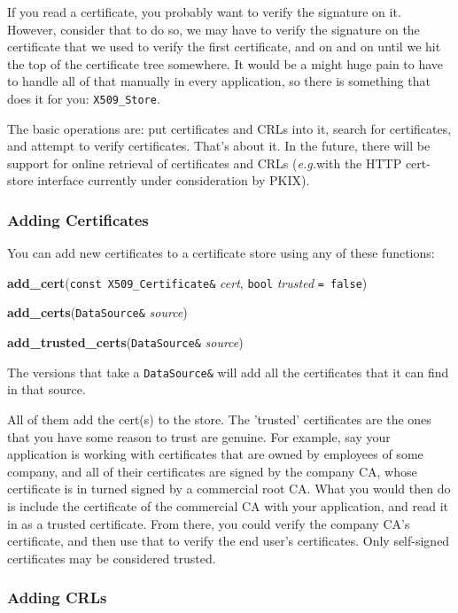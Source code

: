 \documentclass{article}
\newcommand{\function}[1]{\textbf{#1}}
\newcommand{\type}[1]{\texttt{#1}}
\renewcommand{\arg}[1]{\textsl{#1}}
\newcommand{\eg}[0]{\emph{e.g.}}
\begin{document}
If you read a certificate, you probably want to verify the signature on
it. However, consider that to do so, we may have to verify the signature on the
certificate that we used to verify the first certificate, and on and on until
we hit the top of the certificate tree somewhere. It would be a might huge pain
to have to handle all of that manually in every application, so there is
something that does it for you: \type{X509\_Store}.

The basic operations are: put certificates and CRLs into it, search
for certificates, and attempt to verify certificates. That's about
it. In the future, there will be support for online retrieval of
certificates and CRLs (\eg with the HTTP cert-store interface
currently under consideration by PKIX).

\subsubsection{Adding Certificates}

You can add new certificates to a certificate store using any of these
functions:

\function{add\_cert}(\type{const X509\_Certificate\&} \arg{cert},
                     \type{bool} \arg{trusted} \type{= false})

\function{add\_certs}(\type{DataSource\&} \arg{source})

\function{add\_trusted\_certs}(\type{DataSource\&} \arg{source})

The versions that take a \type{DataSource\&} will add all the certificates
that it can find in that source.

All of them add the cert(s) to the store. The 'trusted' certificates are the
ones that you have some reason to trust are genuine. For example, say your
application is working with certificates that are owned by employees of some
company, and all of their certificates are signed by the company CA, whose
certificate is in turned signed by a commercial root CA. What you would then do
is include the certificate of the commercial CA with your application, and read
it in as a trusted certificate. From there, you could verify the company CA's
certificate, and then use that to verify the end user's certificates. Only
self-signed certificates may be considered trusted.

\subsubsection{Adding CRLs}
\end{document}

